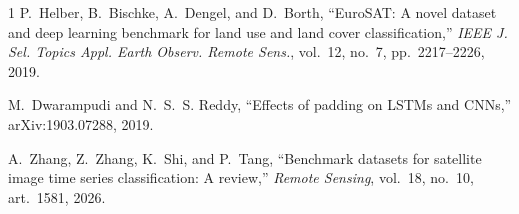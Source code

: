 \documentclass[journal]{IEEEtran}
\begin{document}
\begin{thebibliography}{1}
P.~Helber, B.~Bischke, A.~Dengel, and D.~Borth, ``EuroSAT: A novel dataset and
deep learning benchmark for land use and land cover classification,'' \emph{IEEE
J. Sel. Topics Appl. Earth Observ. Remote Sens.}, vol.~12, no.~7,
pp.~2217--2226, 2019.

M.~Dwarampudi and N.~S.~S. Reddy, ``Effects of padding on LSTMs and CNNs,''
arXiv:1903.07288, 2019.

A.~Zhang, Z.~Zhang, K.~Shi, and P.~Tang, ``Benchmark datasets for satellite
image time series classification: A review,'' \emph{Remote Sensing}, vol.~18,
no.~10, art.~1581, 2026.

\end{thebibliography}
\end{document}
